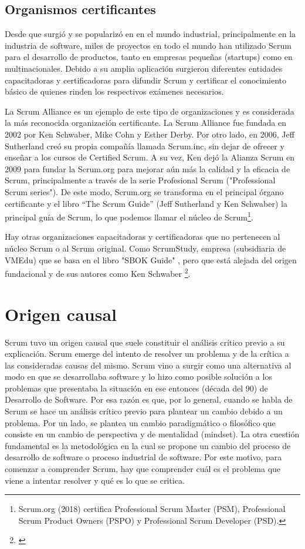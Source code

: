 \subsection{Organismos certificantes}

Desde que surgió y se popularizó en en el mundo industrial, principalmente en la industria de software, miles de proyectos en todo el mundo han utilizado Scrum para el desarrollo de productos, tanto en empresas pequeñas (startups) como en multinacionales. Debido a su amplia aplicación surgieron diferentes entidades capacitadoras y certificadoras para difundir Scrum y certificar el conocimiento básico de quienes rinden los respectivos exámenes necesarios. 

La Scrum Alliance \cite{Scrum-Alliance-2015} es un ejemplo de este tipo de organizaciones y es considerada la más reconocida organización certificante. La Scrum Alliance fue fundada en 2002 por Ken Schwaber, Mike Cohn y Esther Derby. Por otro lado, en 2006, Jeff Sutherland creó su propia compañía llamada Scrum.inc, sin dejar de ofrecer y enseñar a los cursos de Certified Scrum. A su vez, Ken dejó la Alianza Scrum en 2009 para fundar la Scrum.org para mejorar aún más la calidad y la eficacia de Scrum, principalmente a través de la serie Profesional Scrum ("Professional Scrum series"). De este modo, Scrum.org se transforma en el principal órgano certificante y el libro “The Scrum Guide” (Jeff Sutherland y Ken Schwaber) la principal guía de Scrum, lo que podemos llamar el núcleo de Scrum\footnote{Scrum.org (2018) certifica Professional Scrum Master (PSM), Professional Scrum Product Owners (PSPO) y Professional Scrum Developer (PSD).}.

Hay otras organizaciones capacitadoras y certificadoras que no pertenecen al núcleo Scrum o al Scrum original. Como ScrumStudy, empresa (subsidiaria de VMEdu) que se basa en el libro "SBOK Guide" \cite{SBOK-2013}, pero que está alejada del origen fundacional y de sus autores como Ken Schwaber \footnote{\cite{Don-Kim-2016}}.

\section{Origen causal}

Scrum tuvo un origen causal que suele constituir el análisis crítico previo a su explicación. Scrum emerge del intento de resolver un problema y de la crítica a las consideradas causas del mismo. Scrum vino a surgir como una alternativa al modo en que se desarrollaba software y lo hizo como posible solución a los problemas que presentaba la situación en ese entonces (década del 90) de Desarrollo de Software. Por esa razón es que, por lo general, cuando se habla de Scrum se hace un análisis crítico previo para plantear un cambio debido a un problema. Por un lado, se plantea un cambio paradigmático o filosófico que consiste en un cambio de perspectiva y de mentalidad (mindset). La otra cuestión fundamental es la metodológica en la cual se propone un cambio del proceso de desarrollo de software o proceso industrial de software. Por este motivo, para comenzar a comprender Scrum, hay que comprender cuál es el problema que viene a intentar resolver y qué es lo que se critica.

